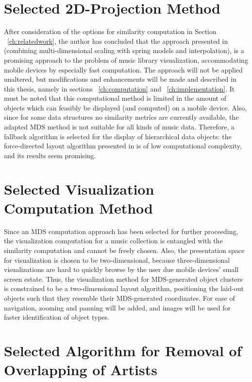 \section{Selected 2D-Projection Method}

After consideration of the options for similarity computation in Section ~\ref{ch:relatedwork}, the author has concluded that the approach presented in \cite{Morrison:2003:FMS} (combining multi-dimensional scaling with spring models and interpolation), is a promising approach to the problem of music library visualization, accommodating mobile devices by especially fast computation. The approach will not be applied unaltered, but modifications and enhancements will be made and described in this thesis, namely in sections ~\ref{ch:computation} and ~\ref{ch:implementation}.
It must be noted that this computational method is limited in the amount of objects which can feasibly be displayed (and computed) on a mobile device. Also, since for some data structures no similarity metrics are currently available, the adapted MDS method is not suitable for all kinds of music data. Therefore, a fallback algorithm is selected for the display of hierarchical data objects: the force-directed layout algorithm presented in \cite{Kobourov04} is of low computational complexity, and its results seem promising.

\section{Selected Visualization Computation Method}

Since an MDS computation approach has been selected for further proceeding, the visualization computation for a music collection is entangled with the similarity computation and cannot be freely chosen. Also, the presentation space for visualization is chosen to be two-dimensional, because three-dimensional visualizations are hard to quickly browse by the user due mobile devices' small screen estate. Thus, the visualization method for MDS-generated object clusters is constrained to be a two-dimensional layout algorithm, positioning the laid-out objects such that they resemble their MDS-generated coordinates. For ease of navigation, zooming and panning will be added, and images will be used for faster identification of object types.

\section{Selected Algorithm for Removal of Overlapping of Artists}

